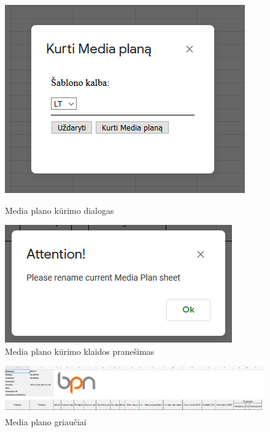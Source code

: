 \begin{figure}[h]
    \centering
    \begin{minipage}{0.45\textwidth}
        \centering
        \includegraphics[scale=0.6]{Images/Screenshots/modal-media-plan.PNG} 
        \caption{Media plano kūrimo dialogas}
    \end{minipage}\hfill
    \begin{minipage}{0.45\textwidth}
        \centering
        \includegraphics[scale=0.8]{Images/Screenshots/modal-media-plan-alert.PNG} 
        \caption{Media plano kūrimo klaidos pranešimas}
    \end{minipage}
\end{figure}

\begin{figure}[H]
    \centering
    \includegraphics[scale=0.35]{Images/Screenshots/media-plan-generic.PNG}
    \caption{Media plano griaučiai}
    \label{img:model}
\end{figure}

